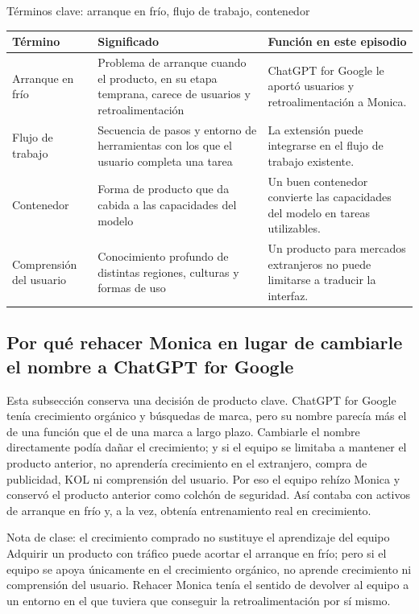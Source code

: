 \begin{knowledgebox}{Términos clave: arranque en frío, flujo de trabajo, contenedor}
\noindent\begin{tabularx}{\textwidth}{p{}p{}X}
\toprule
Término & Significado & Función en este episodio \\
\midrule
Arranque en frío & Problema de arranque cuando el producto, en su etapa temprana, carece de usuarios y retroalimentación & ChatGPT for Google le aportó usuarios y retroalimentación a Monica. \\
Flujo de trabajo & Secuencia de pasos y entorno de herramientas con los que el usuario completa una tarea & La extensión puede integrarse en el flujo de trabajo existente. \\
Contenedor & Forma de producto que da cabida a las capacidades del modelo & Un buen contenedor convierte las capacidades del modelo en tareas utilizables. \\
Comprensión del usuario & Conocimiento profundo de distintas regiones, culturas y formas de uso & Un producto para mercados extranjeros no puede limitarse a traducir la interfaz. \\
\bottomrule
\end{tabularx}
\end{knowledgebox}

\subsection{Por qué rehacer Monica en lugar de cambiarle el nombre a ChatGPT for Google}

Esta subsección conserva una decisión de producto clave. ChatGPT for Google tenía crecimiento orgánico y búsquedas de marca, pero su nombre parecía más el de una función que el de una marca a largo plazo. Cambiarle el nombre directamente podía dañar el crecimiento; y si el equipo se limitaba a mantener el producto anterior, no aprendería crecimiento en el extranjero, compra de publicidad, KOL ni comprensión del usuario. Por eso el equipo rehízo Monica y conservó el producto anterior como colchón de seguridad. Así contaba con activos de arranque en frío y, a la vez, obtenía entrenamiento real en crecimiento.

\begin{importantbox}{Nota de clase: el crecimiento comprado no sustituye el aprendizaje del equipo}
Adquirir un producto con tráfico puede acortar el arranque en frío; pero si el equipo se apoya únicamente en el crecimiento orgánico, no aprende crecimiento ni comprensión del usuario. Rehacer Monica tenía el sentido de devolver al equipo a un entorno en el que tuviera que conseguir la retroalimentación por sí mismo.
\end{importantbox}

